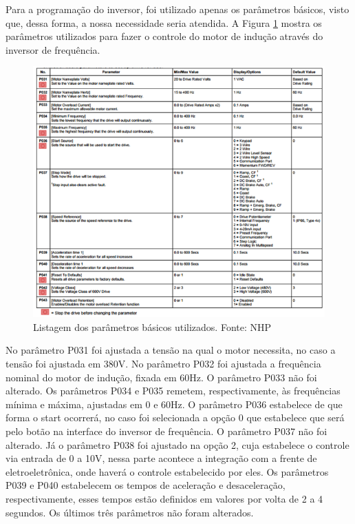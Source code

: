 Para a programação do inversor, foi utilizado apenas os parâmetros básicos, visto que, dessa forma, a nossa necessidade seria atendida. A Figura \ref{Parâmetros do inversor} mostra os parâmetros utilizados para fazer o controle do motor de indução através do inversor de frequência.

\begin{figure}[h!]
	\centering
		\includegraphics[keepaspectratio=true,scale=0.9]{figuras/parametros_inversor.png}
	\caption{Listagem dos parâmetros básicos utilizados. Fonte: NHP}
    \label{Parâmetros do inversor}
\end{figure}

No parâmetro P031 foi ajustada a tensão na qual o motor necessita, no caso a tensão foi ajustada em 380V. No parâmetro P032 foi ajustada a frequência nominal do motor de indução, fixada em 60Hz. O parâmetro P033 não foi alterado. Os parâmetros P034 e P035 remetem, respectivamente, às frequências mínima e máxima, ajustadas em 0 e 60Hz. O parâmetro P036 estabelece de que forma o start ocorrerá, no caso foi selecionada a opção 0 que estabelece que será pelo botão na interface do inversor de frequência. O parâmetro P037 não foi alterado. Já o parâmetro P038 foi ajustado na opção 2, cuja estabelece o controle via entrada de 0 a 10V, nessa parte acontece a integração com a frente de eletroeletrônica, onde haverá o controle estabelecido por eles. Os parâmetros P039 e P040 estabelecem os tempos de aceleração e desaceleração, respectivamente, esses tempos estão definidos em valores por volta de 2 a 4 segundos. Os últimos três parâmetros não foram alterados.

